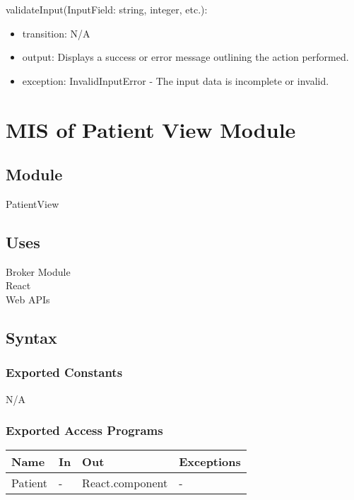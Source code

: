 \documentclass[12pt, titlepage]{article}
\begin{document}
\noindent validateInput(InputField: string, integer, etc.):
\begin{itemize}
\item transition: N/A
\item output: Displays a success or error message outlining the action performed.
\item exception: InvalidInputError - The input data is incomplete or invalid.
\end{itemize}

\newpage

\section{MIS of Patient View Module} \label{Patient_View_Module}

\subsection{Module}
PatientView

\subsection{Uses}
Broker Module \\
React\\
Web APIs\\

\subsection{Syntax}

\subsubsection{Exported Constants}
N/A

\subsubsection{Exported Access Programs}

\begin{center}
\begin{tabular}{p{2cm} p{4cm} p{4cm} p{2cm}}
\hline
\textbf{Name} & \textbf{In} & \textbf{Out} & \textbf{Exceptions} \\
\hline
Patient & - & React.component & - \\
\hline
\end{tabular}
\end{center}
\end{document}
